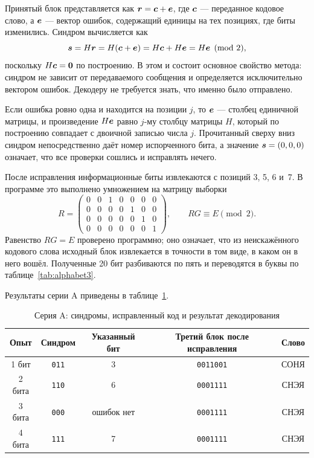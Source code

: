 \documentclass[a4paper,14pt]{extarticle}
\begin{document}
Принятый блок представляется как $\boldsymbol{r} = \boldsymbol{c} + \boldsymbol{e}$, где $\boldsymbol{c}$ ---
переданное кодовое слово, а $\boldsymbol{e}$ --- вектор ошибок, содержащий единицы на тех
позициях, где биты изменились. Синдром вычисляется как
\begin{equation}
  \boldsymbol{s} = H\boldsymbol{r} = H(\boldsymbol{c} + \boldsymbol{e}) = H\boldsymbol{c} + H\boldsymbol{e} = H\boldsymbol{e}
  \pmod 2 ,
  \label{eq:syn}
\end{equation}
поскольку $H\boldsymbol{c} = \boldsymbol{0}$ по построению. В этом и состоит основное свойство
метода: синдром не зависит от передаваемого сообщения и определяется исключительно
вектором ошибок. Декодеру не требуется знать, что именно было отправлено.

Если ошибка ровно одна и находится на позиции $j$, то $\boldsymbol{e}$ --- столбец единичной
матрицы, и произведение $H\boldsymbol{e}$ равно $j$-му столбцу матрицы $H$, который по
построению совпадает с двоичной записью числа $j$. Прочитанный сверху вниз синдром
непосредственно даёт номер испорченного бита, а значение $\boldsymbol{s} = (0,0,0)$ означает,
что все проверки сошлись и исправлять нечего.

После исправления информационные биты извлекаются с позиций 3, 5, 6 и~7. В программе
это выполнено умножением на матрицу выборки
\begin{equation}
  R = \begin{pmatrix} 0&0&1&0&0&0&0 \\ 0&0&0&0&1&0&0 \\ 0&0&0&0&0&1&0 \\ 0&0&0&0&0&0&1 \end{pmatrix},
  \qquad RG \equiv E \pmod 2 .
  \label{eq:R}
\end{equation}
Равенство $RG = E$ проверено программно; оно означает, что из неискажённого кодового
слова исходный блок извлекается в точности в том виде, в каком он в него вошёл.
Полученные 20 бит разбиваются по пять и переводятся в буквы по
таблице~\ref{tab:alphabet3}.

Результаты серии A приведены в таблице~\ref{tab:resA}.

\begin{table}[H]
\caption{Серия A: синдромы, исправленный код и результат декодирования}
\label{tab:resA}
\centering\footnotesize\setlength{\tabcolsep}{7pt}
\begin{tabular}{c|c|c|c|c}
\toprule
Опыт & Синдром & Указанный бит & Третий блок после исправления & Слово \\
\midrule
1 бит & \texttt{011} & 3 & \texttt{0011001} & СОНЯ \\
2 бита & \texttt{110} & 6 & \texttt{0001111} & СНЭЯ \\
3 бита & \texttt{000} & ошибок нет & \texttt{0001111} & СНЭЯ \\
4 бита & \texttt{111} & 7 & \texttt{0001111} & СНЭЯ \\
\bottomrule
\end{tabular}
\end{table}
\end{document}
